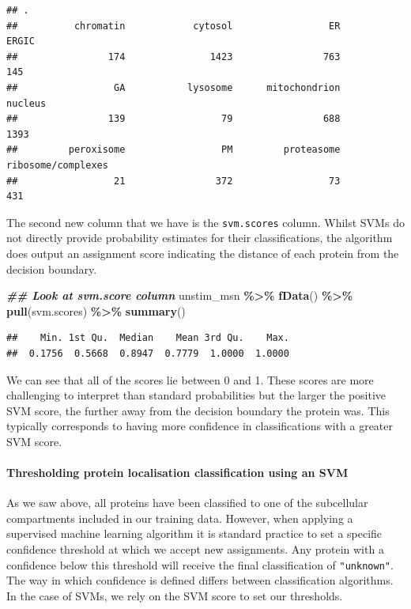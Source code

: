 \documentclass[9pt,a4paper,]{extarticle}
\newenvironment{Shaded}{\begin{snugshade}}{\end{snugshade}}
\newcommand{\DocumentationTok}[1]{\textcolor[rgb]{0.56,0.35,0.01}{\textbf{\textit{#1}}}}
\newcommand{\FunctionTok}[1]{\textcolor[rgb]{0.13,0.29,0.53}{\textbf{#1}}}
\newcommand{\NormalTok}[1]{#1}
\newcommand{\SpecialCharTok}[1]{\textcolor[rgb]{0.81,0.36,0.00}{\textbf{#1}}}
\begin{document}
\begin{verbatim}
## .
##          chromatin            cytosol                 ER              ERGIC 
##                174               1423                763                145 
##                 GA           lysosome      mitochondrion            nucleus 
##                139                 79                688               1393 
##         peroxisome                 PM         proteasome ribosome/complexes 
##                 21                372                 73                431
\end{verbatim}

The second new column that we have is the \texttt{svm.scores} column. Whilst SVMs do
not directly provide probability estimates for their classifications, the
algorithm does output an assignment score indicating the distance of each protein
from the decision boundary.

\begin{Shaded}
\begin{Highlighting}[]
\DocumentationTok{\#\# Look at svm.score column}
\NormalTok{unstim\_msn }\SpecialCharTok{\%\textgreater{}\%}
  \FunctionTok{fData}\NormalTok{() }\SpecialCharTok{\%\textgreater{}\%}
  \FunctionTok{pull}\NormalTok{(svm.scores) }\SpecialCharTok{\%\textgreater{}\%}
  \FunctionTok{summary}\NormalTok{()}
\end{Highlighting}
\end{Shaded}

\begin{verbatim}
##    Min. 1st Qu.  Median    Mean 3rd Qu.    Max. 
##  0.1756  0.5668  0.8947  0.7779  1.0000  1.0000
\end{verbatim}

We can see that all of the scores lie between 0 and 1. These scores are more
challenging to interpret than standard probabilities but the larger the positive
SVM score, the further away from the decision boundary the protein was. This
typically corresponds to having more confidence in classifications with a
greater SVM score.

\paragraph{Thresholding protein localisation classification using an SVM}\label{thresholding-protein-localisation-classification-using-an-svm}

As we saw above, all proteins have been classified to one of the subcellular
compartments included in our training data. However, when applying a supervised
machine learning algorithm it is standard practice to set a specific confidence
threshold at which we accept new assignments. Any protein with a confidence below
this threshold will receive the final classification of \texttt{"unknown"}. The way in
which confidence is defined differs between classification algorithms. In the
case of SVMs, we rely on the SVM score to set our thresholds.
\end{document}
